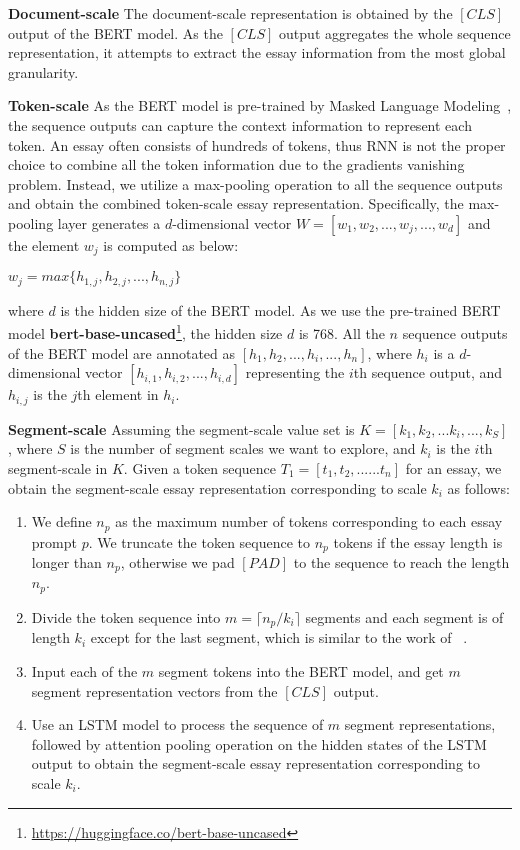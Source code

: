 \documentclass[11pt]{article}
\begin{document}
\textbf{Document-scale}
The document-scale representation is obtained by the $[CLS]$ output of the BERT model. As the $[CLS]$ output aggregates the whole sequence representation, it attempts to extract the essay information from the most global granularity.
   
\textbf{Token-scale}
As the BERT model is pre-trained by Masked Language Modeling~\citep{Devlin:2019}, the sequence outputs can capture the context information to represent each token.
An essay often consists of hundreds of tokens, thus RNN is not the proper choice to combine all the token information due to the gradients vanishing problem.
Instead, we utilize a max-pooling operation to all the sequence outputs and obtain the combined token-scale essay representation.
Specifically, the max-pooling layer generates a $d$-dimensional vector ${W=[w_1, w_2, ..., w_j, ..., w_{d}]}$ and the element $w_j$ is computed as below:
\begin{center}
$w_j = max\{h_{1, j}, h_{2, j}, ..., h_{n, j}\}$
\end{center}
where $d$ is the hidden size of the BERT model.
As we use the pre-trained BERT model \textbf{bert-base-uncased}\footnote{\url{https://huggingface.co/bert-base-uncased}}, the hidden size $d$ is 768.
All the $n$ sequence outputs of the BERT model are annotated as $[h_1, h_2, ..., h_i, ...,  h_n]$, where $h_i$ is a $d$-dimensional vector $[h_{i,1}, h_{i,2}, ..., h_{i,d}]$ representing the $i$th sequence output, and $h_{i, j}$ is the $j$th element in $h_i$.

\textbf{Segment-scale} Assuming the segment-scale value set is $K=[k_1, k_2, ... k_i, ..., k_S]$, where $S$ is the number of segment scales we want to explore, and $k_i$ is the $i${th} segment-scale in $K$.
Given a token sequence $T_{1}=[t_1, t_2, ...... t_n]$ for an essay, we obtain the segment-scale essay representation corresponding to scale $k_i$ as follows:
\begin{enumerate}
\item 
We define $n_p$ as the maximum number of tokens corresponding to each essay prompt $p$.
We truncate the token sequence to $n_p$ tokens if the essay length is longer than $n_p$, otherwise we pad $[PAD]$ to the sequence to reach the length $n_p$.




\item Divide the token sequence into $m = \lceil{n_p/k_i}\rceil$ segments and each segment is of length $k_i$ except for the last segment, which is similar to the work of ~\citep{Mulyar:2019}.
 
\item Input each of the $m$ segment tokens into the BERT model, and get $m$ segment representation vectors from the $[CLS]$ output.

\item Use an LSTM model to process the sequence of $m$ segment representations, followed by attention pooling operation on the hidden states of the LSTM output to obtain the segment-scale essay representation corresponding to scale $k_i$.
\end{enumerate}
  
\end{document}
